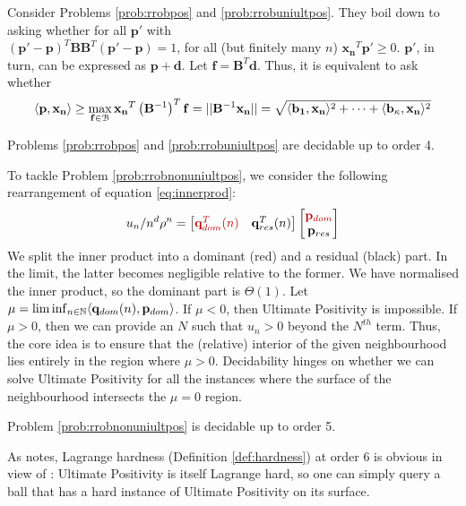 Consider Problems \ref{prob:rrobpos} and \ref{prob:rrobuniultpos}. They boil down to asking whether for all $\mathbf{p'}$ with\\ 
$(\mathbf{p'}-\mathbf{p})^T\mathbf{BB}^T(\mathbf{p'} - \mathbf{p}) = 1$, for all (but finitely many $n$) $\mathbf{x_n}^T\mathbf{p'} \ge 0$. $\mathbf{p'}$, in turn, can be expressed as $\mathbf{p} + \mathbf{d}$. Let $\mathbf{f} = \mathbf{B}^T\mathbf{d}$. Thus, it is equivalent to ask whether
\begin{equation}
\label{eq:crux}
\langle\mathbf{p}, \mathbf{x_n}\rangle \ge \max_{\mathbf{f} \in \mathcal{B}}\mathbf{x_n}^T\left(\mathbf{B}^{-1}\right)^T\mathbf{f} = ||\mathbf{B}^{-1}\mathbf{x_n}|| = \sqrt{\langle\mathbf{b_1}, \mathbf{x_n}\rangle^2 +\dots+\langle\mathbf{b_\kappa}, \mathbf{x_n}\rangle^2}
\end{equation}

\begin{theorem}
\label{thm:decide}
Problems \ref{prob:rrobpos} and \ref{prob:rrobuniultpos} are decidable up to order 4.
\end{theorem}

To tackle Problem \ref{prob:rrobnonuniultpos}, we consider the following rearrangement of equation \ref{eq:innerprod}:
\begin{equation}
\label{eq:grouping}
u_n/n^d\rho^n = \begin{bmatrix}
{\color{red!70!black} \mathbf{q}_{dom}^T(n) } & \mathbf{q}_{res}^T(n)
\end{bmatrix}
\begin{bmatrix}
{\color{red!70!black} \mathbf{p}_{dom}} \\
\mathbf{p}_{res}
\end{bmatrix}
\end{equation}
We split the inner product into a dominant ({\color{red!70!black}red}) and a residual (black) part. In the limit, the latter becomes negligible relative to the former. We have normalised the inner product, so the dominant part is $\Theta(1)$. Let $\mu = \liminf_{n\in \mathbb{N}}\langle \mathbf{q}_{dom}(n), \mathbf{p}_{dom}\rangle$. If $\mu < 0$, then Ultimate Positivity is impossible. If $\mu > 0$, then we can provide an $N$ such that $u_n > 0$ beyond the $N^{th}$ term. Thus, the core idea is to ensure that the (relative) interior of the given neighbourhood lies entirely in the region where $\mu > 0$. Decidability hinges on whether we can solve Ultimate Positivity for all the instances where the surface of the neighbourhood intersects the $\mu = 0$ region.

\begin{theorem}
\label{thm:decide2}
Problem \ref{prob:rrobnonuniultpos} is decidable up to order 5.
\end{theorem}

As \cite{originalarxiv} notes, Lagrange hardness (Definition \ref{def:hardness}) at order 6 is obvious in view of \cite{joeljames3}: Ultimate Positivity is itself Lagrange hard, so one can simply query a ball that has a hard instance of Ultimate Positivity on its surface.

